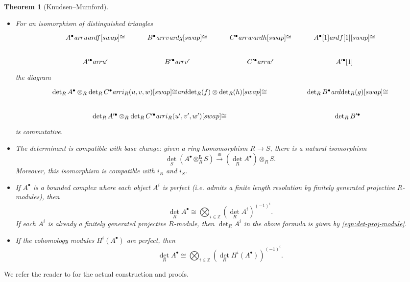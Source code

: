\documentclass[10pt,a4paper,oneside]{article}
\newcommand{\ZZ}{\mathbb{Z}}
\renewcommand{\det}{\operatorname{det}}
\newcommand{\ar}{\text{\it ar}}
\theoremstyle{myplain}
\newtheorem{theorem}{Theorem}[section]
\theoremstyle{mydefinition}
\numberwithin{equation}{section}
\begin{document}
\begin{appendices}
\begin{theorem}[Knudsen--Mumford]
\begin{itemize}
  \item For an isomorphism of distinguished triangles
    \[ \begin{tikzcd}
        A^\bullet \ar{r}{u}\ar{d}{f}[swap]{\cong} & B^\bullet \ar{r}{v}\ar{d}{g}[swap]{\cong} & C^\bullet \ar{r}{w}\ar{d}{h}[swap]{\cong} & A^\bullet [1]\ar{d}{f[1]}[swap]{\cong} \\
        A'^\bullet \ar{r}{u'} & B'^\bullet \ar{r}{v'} & C'^\bullet \ar{r}{w'} & A'^\bullet [1]
      \end{tikzcd} \]
    the diagram
    \[ \begin{tikzcd}[column sep=5em]
        \det_R A^\bullet \otimes_R \det_R C^\bullet \ar{r}{i_R (u,v,w)}[swap]{\cong}\ar{d}{\det_R (f) \otimes \det_R (h)}[swap]{\cong} & \det_R B^\bullet\ar{d}{\det_R (g)}[swap]{\cong} \\
        \det_R A'^\bullet \otimes_R \det_R C'^\bullet \ar{r}{i_R (u',v',w')}[swap]{\cong} & \det_R B'^\bullet
      \end{tikzcd} \]
    is commutative.

  \item The determinant is compatible with base change: given a ring
    homomorphism $R\to S$, there is a natural isomorphism
    \[ \det_S (A^\bullet \otimes_R^\mathbf{L} S)
      \xrightarrow{\cong}
      (\det_R A^\bullet) \otimes_R S. \]
    Moreover, this isomorphism is compatible with $i_R$ and $i_S$.

  \item If $A^\bullet$ is a bounded complex where each object $A^i$ is perfect
    (i.e. admits a finite length resolution by finitely generated projective
    $R$-modules), then
    $$\det_R A^\bullet \cong \bigotimes_{i\in \ZZ} (\det_R A^i)^{(-1)^i}.$$
    If each $A^i$ is already a finitely generated projective $R$-module, then
    $\det_R A^i$ in the above formula is given by \eqref{eqn:det-proj-module}.

  \item If the cohomology modules $H^i (A^\bullet)$ are perfect, then
    \begin{equation}
      \label{eqn:det-in-terms-of-cohomology}
      \det_R A^\bullet \cong
      \bigotimes_{i\in \ZZ} (\det_R H^i (A^\bullet))^{(-1)^i}.
    \end{equation}
  \end{itemize}
\end{theorem}

We refer the reader to \cite{Knudsen-Mumford-1976} for the actual construction
and proofs.


\end{appendices}
\end{document}
